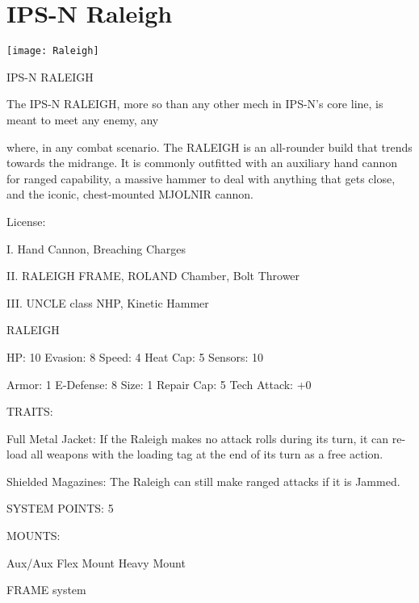 \section{IPS-N Raleigh}

\texttt{[image: Raleigh]}

                                              IPS-N RALEIGH

The IPS-N RALEIGH, more so than any other mech in IPS-N’s core line, is meant to meet any enemy, any

where, in any combat scenario. The RALEIGH is an all-rounder build that trends towards the midrange. It is
commonly outfitted with an auxiliary hand cannon for ranged capability, a massive hammer to deal with
anything that gets close, and the iconic, chest-mounted MJOLNIR cannon.

                                                      License:

I. Hand Cannon, Breaching Charges

II. RALEIGH FRAME, ROLAND Chamber, Bolt Thrower

III. UNCLE class NHP, Kinetic Hammer





                                                    RALEIGH

  HP: 10          Evasion: 8                              Speed: 4            Heat Cap: 5         Sensors: 10

  Armor: 1        E-Defense: 8                            Size: 1             Repair Cap: 5       Tech Attack:
                                                                                                  +0

                                                      TRAITS:

  Full Metal Jacket: If the Raleigh makes no attack rolls during its turn, it can re-load all weapons with
  the loading tag at the end of its turn as a free action.

  Shielded Magazines: The Raleigh can still make ranged attacks if it is Jammed.

                                               SYSTEM POINTS: 5

                                                     MOUNTS:

  Aux/Aux                             Flex Mount                              Heavy Mount

                                                  FRAME system


